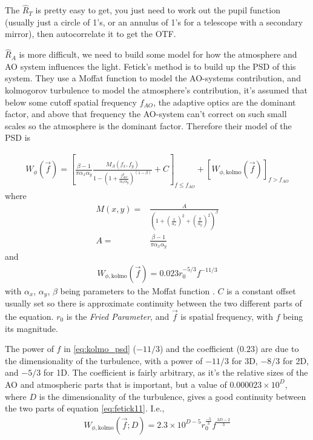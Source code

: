 The $\hat{R}_T$ is pretty easy to get, you just need to work out the pupil function (usually just a circle of 1's, or an annulus of 1's for a telescope with a secondary mirror), then autocorrelate it to get the OTF.

$\hat{R}_A$ is more difficult, we need to build some model for how the atmosphere and AO system influences the light. Fetick's method is to build up the PSD of this system. They use a Moffat function to model the AO-systems contribution, and kolmogorov turbulence to model the atmosphere's contribution, it's assumed that below some cutoff spatial frequency $f_{AO}$, the adaptive optics are the dominant factor, and above that frequency the AO-system can't correct on such small scales so the atmosphere is the dominant factor. Therefore their model of the PSD is \cite[see][eq 11, eq 2, eq 3, eq 10]{Fetick19}

\begin{align}
	W_\phi(\vec{f}) = \left[ 
		\frac{\beta -1}{\pi \alpha_x \alpha_y}
		\frac{M_A(f_x, f_y)}{ 1 - \left( 1 + \frac{f_{AO}^2}{\alpha_x \alpha_y}\right)^{(1-\beta)}} + C
		\right]_{f \leq f_{AO}}
		+
		\left[W_{\phi,\textrm{kolmo}}(\vec{f}) \right]_{f>f_{AO}}
		\label{eq:fetick11}
\end{align}
where
\begin{align}
	M(x,y) =& \frac{A}{\left(1 + \left(\frac{x}{\alpha_x}\right)^2 + \left(\frac{y}{\alpha_y}\right)^2 \right)^\beta} \label{eq:moffat}\\
	A =& \frac{\beta -1}{\pi \alpha_x \alpha_y} \nonumber
\end{align}
and
\begin{align}
	W_{\phi,\textrm{kolmo}}(\vec{f}) = 0.023 r_0^{-5/3} f^{-11/3}
	\label{eq:kolmo_psd}
\end{align}
with $\alpha_x$, $\alpha_y$, $\beta$ being parameters to the Moffat function \cite{Moffat69}. $C$ is a constant offset usually set so there is approximate continuity between the two different parts of the equation. $r_0$ is the \emph{Fried Parameter}, and $\vec{f}$ is spatial frequency, with $f$ being its magnitude. 

The power of $f$ in \eqref{eq:kolmo_psd} ($-11/3$) and the coefficient ($0.23$) are due to the dimensionality of the turbulence, with a power of $-11/3$ for 3D, $-8/3$ for 2D, and $-5/3$ for 1D. The coefficient is fairly arbitrary, as it's the relative sizes of the AO and atmospheric parts that is important, but a value of $0.000023 \times 10^D$, where $D$ is the dimensionality of the turbulence, gives a good continuity between the two parts of equation \eqref{eq:fetick11}. I.e.,
\begin{align}
	W_{\phi,\textrm{kolmo}}(\vec{f}; D) = 2.3\times10^{D-5} r_0^{\frac{-5}{3}} f^{\frac{3D-2}{3}}
	\label{eq:kolmo_psd_dim}
\end{align}

